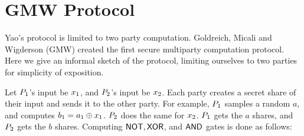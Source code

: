 \section{GMW Protocol}
  Yao's protocol is limited to two party computation. Goldreich, Micali and Wigderson
  (GMW) created the first secure multiparty computation protocol. Here we give an
  informal sketch of the protocol, limiting ourselves to two parties for simplicity
  of exposition.

  Let $P_1$'s input be $x_1$, and $P_2$'s input be $x_2$. Each
  party creates a secret share of their input and sends it to the other party.
  For example, $P_1$ samples a random $a$, and computes $b_1 = a_1 \oplus x_1$.
  $P_2$ does the same for $x_2$. $P_1$ gets the $a$ shares, and
  $P_2$ gets the $b$ shares. Computing $\mathsf{NOT},\allowbreak \mathsf{XOR}$, and $\mathsf{AND}$
  gates is done as follows:
